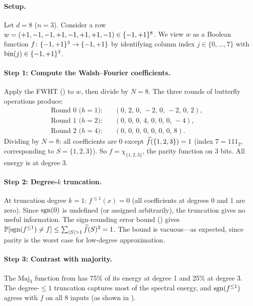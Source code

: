 \paragraph{Setup.}
Let $d = 8$ ($n = 3$). Consider a row $w = (+1, -1, -1, +1, -1, +1, +1, -1) \in \{-1,+1\}^8$.
We view $w$ as a Boolean function $f \colon \{-1,+1\}^3 \to \{-1,+1\}$ by
identifying column index $j \in \{0, \ldots, 7\}$ with
$\text{bin}(j) \in \{-1,+1\}^3$.

\paragraph{Step 1: Compute the Walsh--Fourier coefficients.}
Apply the FWHT () to $w$, then divide by $N = 8$.
The three rounds of butterfly operations produce:
\begin{align*}
  \text{Round 0 ($h{=}1$):}\quad & (0,\, 2,\, 0,\, {-}2,\, 0,\, {-}2,\, 0,\, 2), \\
  \text{Round 1 ($h{=}2$):}\quad & (0,\, 0,\, 0,\, 4,\, 0,\, 0,\, 0,\, {-}4), \\
  \text{Round 2 ($h{=}4$):}\quad & (0,\, 0,\, 0,\, 0,\, 0,\, 0,\, 0,\, 8).
\end{align*}
Dividing by $N = 8$: all coefficients are $0$ except
$\widehat{f}(\{1,2,3\}) = 1$ (index $7 = 111_2$, corresponding to
$S = \{1,2,3\}$).
So $f = \chi_{\{1,2,3\}}$, the parity function on 3 bits. All energy
is at degree 3.

\paragraph{Step 2: Degree-$k$ truncation.}
At truncation degree $k = 1$: $f^{\leq 1}(x) = 0$ (all coefficients at
degrees 0 and 1 are zero). Since $\operatorname{sgn}(0)$ is undefined (or assigned
arbitrarily), the truncation gives no useful information. The
sign-rounding error bound () gives
$\Prob[\sgn(f^{\leq 1}) \neq f] \leq \sum_{|S|>1} \fhat(S)^2 = 1$.
The bound is vacuous---as expected, since parity is the worst case for
low-degree approximation.

\paragraph{Step 3: Contrast with majority.}
The $\text{Maj}_3$ function from  has 75\% of its
energy at degree 1 and 25\% at degree 3. The degree-$\leq 1$ truncation
captures most of the spectral energy, and $\operatorname{sgn}(f^{\leq 1})$ agrees with
$f$ on all 8 inputs (as shown in ).

